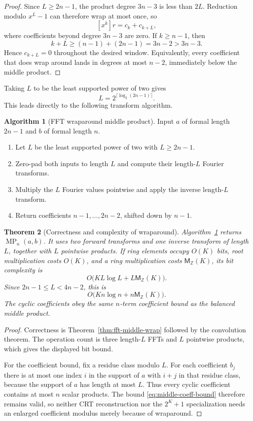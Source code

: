 \documentclass[11pt]{book}
\newtheorem{theorem}{Theorem}[section]
\theoremstyle{definition}
\newtheorem{algorithm}[theorem]{Algorithm}
\newcommand{\ZZ}{\mathbb Z}
\newcommand{\MZ}{\mathsf M_{\ZZ}}
\begin{document}
\begin{proof}
Since $L\geq2n-1$, the product degree $3n-3$ is less than $2L$.  Reduction
modulo $x^L-1$ can therefore wrap at most once, so
\[
 [x^k]r=c_k+c_{k+L},
\]
where coefficients beyond degree $3n-3$ are zero.  If $k\geq n-1$, then
\[
 k+L\geq(n-1)+(2n-1)=3n-2>3n-3.
\]
Hence $c_{k+L}=0$ throughout the desired window.  Equivalently, every
coefficient that does wrap around lands in degrees at most $n-2$, immediately
below the middle product.
\end{proof}

Taking $L$ to be the least supported power of two gives
\[
 L=2^{\lceil\log_2(2n-1)\rceil}.
\]
This leads directly to the following transform algorithm.

\begin{algorithm}[FFT wraparound middle product]
\label{alg:fft-middle-wrap}
Input $a$ of formal length $2n-1$ and $b$ of formal length $n$.
\begin{enumerate}
 \item Let $L$ be the least supported power of two with $L\geq2n-1$.
 \item Zero-pad both inputs to length $L$ and compute their length-$L$
 Fourier transforms.
 \item Multiply the $L$ Fourier values pointwise and apply the inverse
 length-$L$ transform.
 \item Return coefficients $n-1,\ldots,2n-2$, shifted down by $n-1$.
\end{enumerate}
\end{algorithm}

\begin{theorem}[Correctness and complexity of wraparound]
\label{thm:fft-middle-wrap-complexity}
Algorithm~\ref{alg:fft-middle-wrap} returns $\operatorname{MP}_n(a,b)$.
It uses two forward transforms and one inverse transform of length $L$, together
with $L$ pointwise products.  If ring elements occupy $O(K)$ bits, root
multiplication costs $O(K)$, and a ring multiplication costs $\MZ(K)$, its bit
complexity is
\[
 O\bigl(KL\log L+L\MZ(K)\bigr).
\]
Since $2n-1\leq L<4n-2$, this is
\[
 O\bigl(Kn\log n+n\MZ(K)\bigr).
\]
The cyclic coefficients obey the same $n$-term coefficient bound as the
balanced middle product.
\end{theorem}

\begin{proof}
Correctness is Theorem~\ref{thm:fft-middle-wrap} followed by the convolution
theorem.  The operation count is three length-$L$ FFTs and $L$ pointwise
products, which gives the displayed bit bound.

For the coefficient bound, fix a residue class modulo $L$.  For each
coefficient $b_j$ there is at most one index $i$ in the support of $a$ with
$i+j$ in that residue class, because the support of $a$ has length at most
$L$.  Thus every cyclic coefficient contains at most $n$ scalar products.
The bound \eqref{eq:middle-coeff-bound} therefore remains valid, so neither
CRT reconstruction nor the $2^K+1$ specialization needs an enlarged
coefficient modulus merely because of wraparound.
\end{proof}
\end{document}
